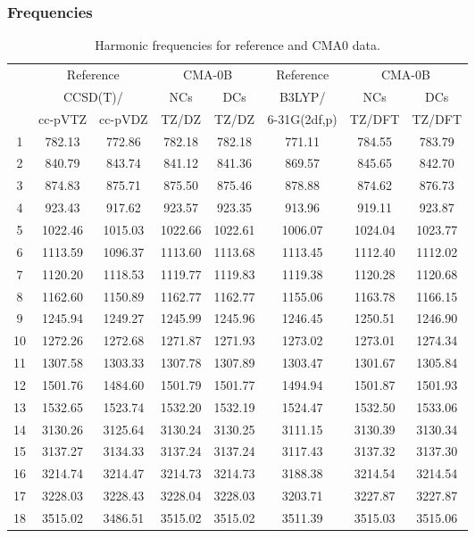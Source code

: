 \documentclass[10pt,oneside]{article}
\begin{document}
\subsubsection*{Frequencies}
\begin{table}[h!]
\centering
\caption{Harmonic frequencies for reference and CMA0 data.}
\begin{tabular}{cccccccc}
\toprule
{} & \multicolumn{2}{c}{Reference} & \multicolumn{2}{c}{CMA-0B} &    Reference & \multicolumn{2}{c}{CMA-0B} \\
{} & \multicolumn{2}{c}{CCSD(T)/} &     NCs &     DCs &       B3LYP/ &     NCs &     DCs \\
{} &   cc-pVTZ & cc-pVDZ &   TZ/DZ &   TZ/DZ & 6-31G(2df,p) &  TZ/DFT &  TZ/DFT \\
\midrule
1  &    782.13 &  772.86 &  782.18 &  782.18 &       771.11 &  784.55 &  783.79 \\
2  &    840.79 &  843.74 &  841.12 &  841.36 &       869.57 &  845.65 &  842.70 \\
3  &    874.83 &  875.71 &  875.50 &  875.46 &       878.88 &  874.62 &  876.73 \\
4  &    923.43 &  917.62 &  923.57 &  923.35 &       913.96 &  919.11 &  923.87 \\
5  &   1022.46 & 1015.03 & 1022.66 & 1022.61 &      1006.07 & 1024.04 & 1023.77 \\
6  &   1113.59 & 1096.37 & 1113.60 & 1113.68 &      1113.45 & 1112.40 & 1112.02 \\
7  &   1120.20 & 1118.53 & 1119.77 & 1119.83 &      1119.38 & 1120.28 & 1120.68 \\
8  &   1162.60 & 1150.89 & 1162.77 & 1162.77 &      1155.06 & 1163.78 & 1166.15 \\
9  &   1245.94 & 1249.27 & 1245.99 & 1245.96 &      1246.45 & 1250.51 & 1246.90 \\
10 &   1272.26 & 1272.68 & 1271.87 & 1271.93 &      1273.02 & 1273.01 & 1274.34 \\
11 &   1307.58 & 1303.33 & 1307.78 & 1307.89 &      1303.47 & 1301.67 & 1305.84 \\
12 &   1501.76 & 1484.60 & 1501.79 & 1501.77 &      1494.94 & 1501.87 & 1501.93 \\
13 &   1532.65 & 1523.74 & 1532.20 & 1532.19 &      1524.47 & 1532.50 & 1533.06 \\
14 &   3130.26 & 3125.64 & 3130.24 & 3130.25 &      3111.15 & 3130.39 & 3130.34 \\
15 &   3137.27 & 3134.33 & 3137.24 & 3137.24 &      3117.43 & 3137.32 & 3137.30 \\
16 &   3214.74 & 3214.47 & 3214.73 & 3214.73 &      3188.38 & 3214.54 & 3214.54 \\
17 &   3228.03 & 3228.43 & 3228.04 & 3228.03 &      3203.71 & 3227.87 & 3227.87 \\
18 &   3515.02 & 3486.51 & 3515.02 & 3515.02 &      3511.39 & 3515.03 & 3515.06 \\
\bottomrule
\end{tabular}
\end{table}
\end{document}
